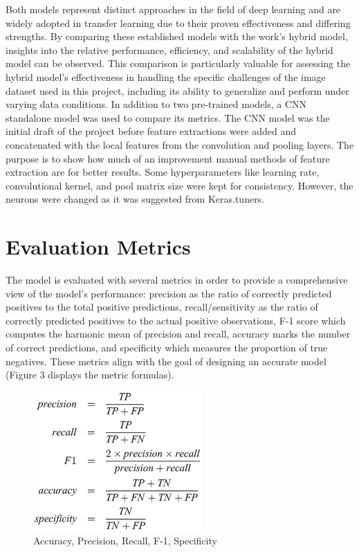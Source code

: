 \documentclass[10pt,twocolumn]{article}
\begin{document}
\begin{enumerate}
    Both models represent distinct approaches in the field of deep learning and are widely adopted in transfer learning due to their proven effectiveness and differing strengths. By comparing these established models with the work’s hybrid model, insights into the relative performance, efficiency, and scalability of the hybrid model can be observed. This comparison is particularly valuable for assessing the hybrid model's effectiveness in handling the specific challenges of the image dataset used in this project, including its ability to generalize and perform under varying data conditions. \newline
    In addition to two pre-trained models, a CNN standalone model was used to compare its metrics. The CNN model was the initial draft of the project before feature extractions were added and concatenated with the local features from the convolution and pooling layers. The purpose is to show how much of an improvement manual methods of feature extraction are for better results. Some hyperparameters like learning rate, convolutional kernel, and pool matrix size were kept for consistency. However, the neurons were changed as it was suggested from Keras.tuners. 

\end{enumerate}

\section{Evaluation Metrics}

The model is evaluated with several metrics in order to provide a comprehensive view of the model’s performance: precision as the ratio of correctly predicted positives to the total positive predictions, recall/sensitivity as the ratio of correctly predicted positives to the actual positive observations, F-1 score which computes the harmonic mean of precision and recall, accuracy marks the number of correct predictions, and specificity which measures the proportion of true negatives. These metrics align with the goal of designing an accurate model (Figure 3 displays the metric formulas).

\begin{figure}[h]
\centering
\caption{Accuracy, Precision, Recall, F-1, Specificity}
\includegraphics[scale=0.5]{Formulas.png}\newline
\end{figure}
\end{document}
